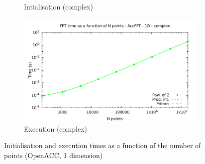 \documentclass[12pt, a4paper]{article}
\begin{document}
\begin{figure}[H]
\begin{subfigure}{.5\textwidth}
\caption{Intialisation (complex)}
\label{FFTACC1DCI}
\end{subfigure}%
\begin{subfigure}{.5\textwidth}
\centering
\includegraphics[width=.9\linewidth]{graphs/fft-openacc-1d-pow2-c-exec.pdf}
\caption{Execution (complex)}
\label{FFTACC1DCE}
\end{subfigure}
\caption{Initialisation and execution times as a function of the number of points (OpenACC, 1 dimension)}
\label{FFTCL1D}
\end{figure}
\end{document}
